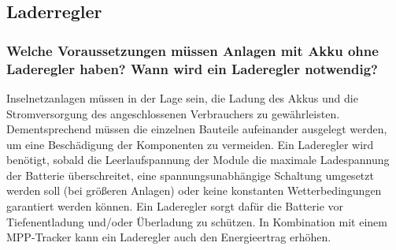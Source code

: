 \subsection{Laderregler}
\subsubsection{Welche Voraussetzungen müssen Anlagen mit Akku ohne Laderegler haben? Wann wird ein Laderegler notwendig?}
Inselnetzanlagen müssen in der Lage sein, die Ladung des Akkus und die Stromversorgung des angeschlossenen Verbrauchers zu gewährleisten. Dementsprechend müssen die einzelnen Bauteile aufeinander ausgelegt werden, um eine Beschädigung der Komponenten zu vermeiden. Ein Laderegler wird benötigt, sobald die Leerlaufspannung der Module die maximale Ladespannung der Batterie überschreitet, eine spannungsunabhängige Schaltung umgesetzt werden soll (bei größeren Anlagen) oder keine konstanten Wetterbedingungen garantiert werden können. Ein Laderegler sorgt dafür die Batterie vor Tiefenentladung und/oder Überladung zu schützen. In Kombination mit einem MPP-Tracker kann ein Laderegler auch den Energieertrag erhöhen. 
